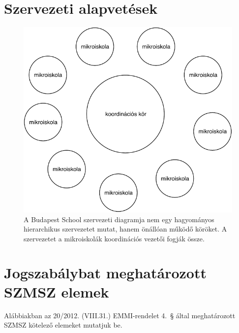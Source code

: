 \chapter{Szervezeti alapvetések}


 
\begin{figure}[htb]
    \begin{center}
    \includegraphics{chapters/szmsz/org_chart.pdf} 
    \end{center}
    \caption{A Budapest School szervezeti diagramja nem egy hagyományos hierarchikus szervezetet mutat, hanem önállóan működő köröket. A szervezetet a mikroiskolák koordinációs vezetői fogják össze. }
\end{figure}



%
%


\chapter{Jogszabálybat meghatározott SZMSZ elemek}
Alábbiakban az 20/2012. (VIII.31.) EMMI-rendelet 4.~§ által meghatározott SZMSZ kötelező elemeket mutatjuk be. 


